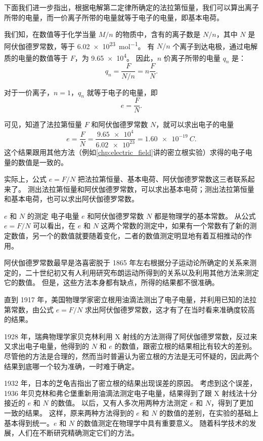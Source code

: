 下面我们进一步指出，根据电解第二定律所确定的法拉第恒量，我们可以算出离子所带的电量，而一价离子所带的电量就等于电子的电量，即基本电荷。

我们知，在数值等于化学当量 $M/n$ 的物质中，含有的离子数是 $N/n$，其中 $N$ 是阿伏伽德罗常数，等于 \qty{6.02e23}{mol^{-1}}。
有 $N/n$ 个离子到达电极，通过电解质的电量的数值等于 $F$，为 \num{9.65e4}。
因此，$n$ 价离子所带的电量 $q_n$ 是：
\[q_n=\frac{F}{N/n}=n\frac{F}{N}.\]

对于一价离子，$n=1$，$q_n$ 就等于电子的电量，即
\[e=\frac{F}{N}.\]

可见，知道了法拉第恒量 $F$ 和阿伏伽德罗常数 $N$，就可以求出电子的电量 
\[e=\frac{F}{N}=\frac{\num{9.65e4}}{\num{6.02e23}}=\qty{1.60e-19}{C}.\]
这个结果跟用其他方法（例如\cref{chp:electric_field}讲的密立根实验）求得的电子电量的数值是一致的。

实际上，公式 $e=F/N$ 把法拉第恒量、基本电荷、阿伏伽德罗常数这三者联系起来了。
测出法拉第恒量和阿伏伽德罗常数，可以求出基本电荷；测出法拉第恒量和基本电荷，也可以求出阿伏伽德罗常数。

\begin{Reading}{$e$ 和 $N$ 的测定}
电子电量 $e$ 和阿伏伽德罗常数 $N$ 都是物理学的基本常数。
从公式 $e=F/N$ 可以看出，在 $e$ 和 $N$ 这两个常数的测定中，如果有一个常数有了新的测定数值，另一个的数值就要随着变化，二者的数值测定明显地有着互相推动的作用。

阿伏伽德罗常数最早是洛喜密脱于 1865 年左右根据分子运动论所确定的关系来测定的，二十世纪初又有人利用研究布朗运动所得到的关系以及利用其他方法来测定它的数值。
但是，这些方法本身都有缺点，所得的结果都不很准确。

直到 1917 年，美国物理学家密立根用油滴法测出了电子电量，并利用已知的法拉第常数，由公式 $e=F/N$ 求出阿伏伽德罗常数，这才有了在当时看来准确度较高的结果。

1928 年，瑞典物理学家贝克林利用 X 射线的方法测得了阿伏伽德罗常数，反过来又求出电子电量，他得到的 $N$ 和 $e$ 的数值，跟密立根的结果相比有较大的差别。
尽管他的方法是合理的，然而当时普遍认为密立根的方法是无可怀疑的，因此两个结果到底哪一个较为准确，一时难于确定。

1932 年，日本的芝龟吉指出了密立根的结果出现误差的原因。
考虑到这个误差，1936 年贝克林和弗仑堡重新用油滴法测定电子电量，结果得到了跟 X 射线法十分接近的 $e$ 和 $N$ 的数值。
以后，又有人多次用两种方法测定 $e$ 和 $N$，得到了更加一致的结果。
这样，原来两种方法得到的 $e$ 和 $N$ 的数值的差别，在实验的基础上基本得到统一。$e$ 和 $N$ 的数值测定在物理学中具有重要意义。
随着科学技术的发展，人们在不断研究精确测定它们的方法。
\end{Reading}

